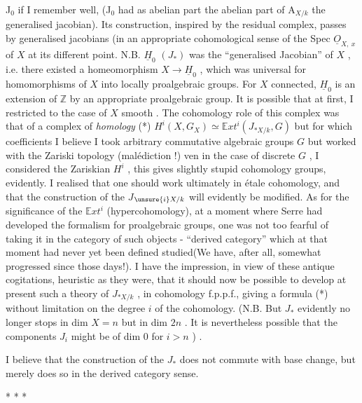 
J$_0$ if I remember well, (J$_0$ had as abelian part the abelian part of A$_{X/k}$\hand{\unsure{)|,}}
the  generalised jacobian). Its construction, inspired by the
residual complex, passes by generalised jacobians (in an appropriate cohomological
sense\hand{)} of the  Spec $\underline{O}_{X,\ x}$ of $X$ at its different point.
\margin{$\llcorner$}N.B. $\underline{H}_0$ $(J_*)$ was the ``generalised Jacobian'' of $X$ , i.e. there existed a
homeomorphism $X \to \underline{H}_0$ , which was universal for homomorphisms of $X$ into 
locally proalgebraic groups. For $X$ connected, $\underline{H}_0$ is an extension of $\mathbb{Z}$
by an appropriate proalgebraic group.
It is possible that\hand{,} at first, I restricted to the case of $X$ smooth .
The cohomology role of this complex was that of a complex of \textit{homology}
(*) $H^i(X, G_X) \simeq \mathbb{E}xt^i(J_{*X/k}, G)$ but for which coefficients I believe
I took arbitrary commutative algebraic groups $G$ but worked with the
Zariski topology (malédiction !) ven in the case of discrete $G$ , I considered
the Zariskian $H^i$ , this gives slightly stupid cohomology groups, evidently.
I realised that one should work ultimately in étale cohomology, and that
the construction of the \hand{(}$J$\hand{)}$_{\unsure{i}X/k}$ will evidently be modified. As for the
significance of the $\mathbb{E}xt^i$ (hypercohomology), at a moment where Serre had
developed the formalism for proalgebraic groups, one was not too fearful of
taking it in the category of such objects -  ``derived category''
which at that moment had never yet been  defined  studied(We have, after
all, somewhat progressed since those days!). I have the impression, in
view of these antique cogitations, heuristic as they were, that it should
now be possible to develop at present such a theory of $J_{*X/k}$ , in cohomology
f.p.p.f., giving a formula (*) without limitation on the degree $i$ of the
cohomology. (N.B. But $J_*$ evidently no longer stops in dim $X = n$ but
in dim $2n$ . It is nevertheless possible that the components $J_i$ might be
of dim 0 for $i > n$ ) .

I believe that the construction of the $J_*$ does not commute with base
change, but merely does so in the derived category sense.

* *
*

